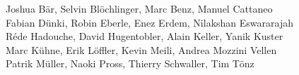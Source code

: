 %
%
%
Joshua Bär,			%
Selvin Blöchlinger,		%
Marc Benz,			%
Manuel Cattaneo%
\\
Fabian Dünki,			%
Robin Eberle,			%
Enez Erdem,			%
Nilakshan Eswararajah%
\\
Réde Hadouche,			%
David Hugentobler,		%
Alain Keller,			%
Yanik Kuster%
\\
Marc Kühne,			%
Erik Löffler,			%
Kevin Meili,			%
Andrea Mozzini Vellen%
\\
Patrik Müller,			%
Naoki Pross,			%
Thierry Schwaller,		%
Tim Tönz			%

